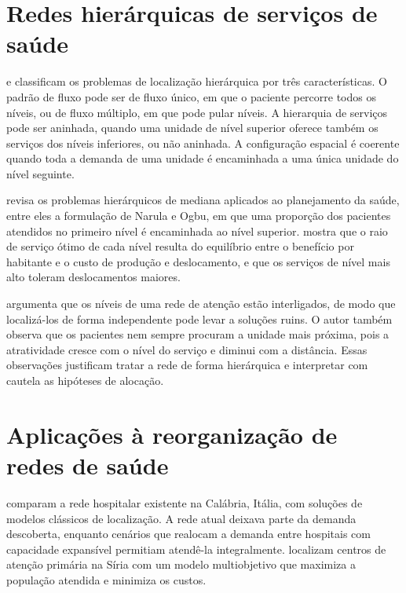 \documentclass[12pt,a4paper,oneside]{report}
\begin{document}
\section{Redes hierárquicas de serviços de saúde}

\citet{sahin2007} e \citet{contreras2019} classificam os problemas de localização hierárquica por três
características. O padrão de fluxo pode ser de fluxo único, em que o paciente percorre todos os níveis,
ou de fluxo múltiplo, em que pode pular níveis. A hierarquia de serviços pode ser aninhada, quando uma
unidade de nível superior oferece também os serviços dos níveis inferiores, ou não aninhada. A
configuração espacial é coerente quando toda a demanda de uma unidade é encaminhada a uma única unidade
do nível seguinte.

\citet{narula1986} revisa os problemas hierárquicos de mediana aplicados ao planejamento da saúde, entre
eles a formulação de Narula e Ogbu, em que uma proporção dos pacientes atendidos no primeiro nível é
encaminhada ao nível superior. \citet{schultz1970} mostra que o raio de serviço ótimo de cada nível
resulta do equilíbrio entre o benefício por habitante e o custo de produção e deslocamento, e que os
serviços de nível mais alto toleram deslocamentos maiores.

\citet{hodgson1988} argumenta que os níveis de uma rede de atenção estão interligados, de modo que
localizá-los de forma independente pode levar a soluções ruins. O autor também observa que os pacientes
nem sempre procuram a unidade mais próxima, pois a atratividade cresce com o nível do serviço e diminui
com a distância. Essas observações justificam tratar a rede de forma hierárquica e interpretar com
cautela as hipóteses de alocação.

\section{Aplicações à reorganização de redes de saúde}

\citet{guerriero2016} comparam a rede hospitalar existente na Calábria, Itália, com soluções de modelos
clássicos de localização. A rede atual deixava parte da demanda descoberta, enquanto cenários que
realocam a demanda entre hospitais com capacidade expansível permitiam atendê-la integralmente.
\citet{mic2019} localizam centros de atenção primária na Síria com um modelo multiobjetivo que maximiza
a população atendida e minimiza os custos.
\end{document}
